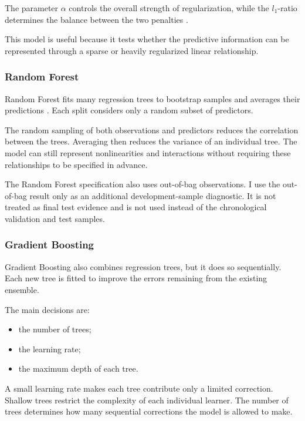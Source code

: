 \documentclass[11pt,a4paper]{article}
\begin{document}
The parameter \(\alpha\) controls the overall strength of regularization, while
the \(l_1\)-ratio determines the balance between the two penalties
\parencite{tibshirani1996regression,zou2005regularization}.

This model is useful because it tests whether the predictive information can be
represented through a sparse or heavily regularized linear relationship.

\subsubsection*{Random Forest}

Random Forest fits many regression trees to bootstrap samples and averages
their predictions \parencite{breiman2001random}. Each split considers only a
random subset of predictors.

The random sampling of both observations and predictors reduces the correlation
between the trees. Averaging then reduces the variance of an individual tree.
The model can still represent nonlinearities and interactions without requiring
these relationships to be specified in advance.

The Random Forest specification also uses out-of-bag observations. I use the
out-of-bag result only as an additional development-sample diagnostic. It is not
treated as final test evidence and is not used instead of the chronological
validation and test samples.

\subsubsection*{Gradient Boosting}

Gradient Boosting also combines regression trees, but it does so sequentially.
Each new tree is fitted to improve the errors remaining from the existing
ensemble.

The main decisions are:

\begin{itemize}
  \item the number of trees;
  \item the learning rate;
  \item the maximum depth of each tree.
\end{itemize}

A small learning rate makes each tree contribute only a limited correction.
Shallow trees restrict the complexity of each individual learner. The number of
trees determines how many sequential corrections the model is allowed to make.
\end{document}
